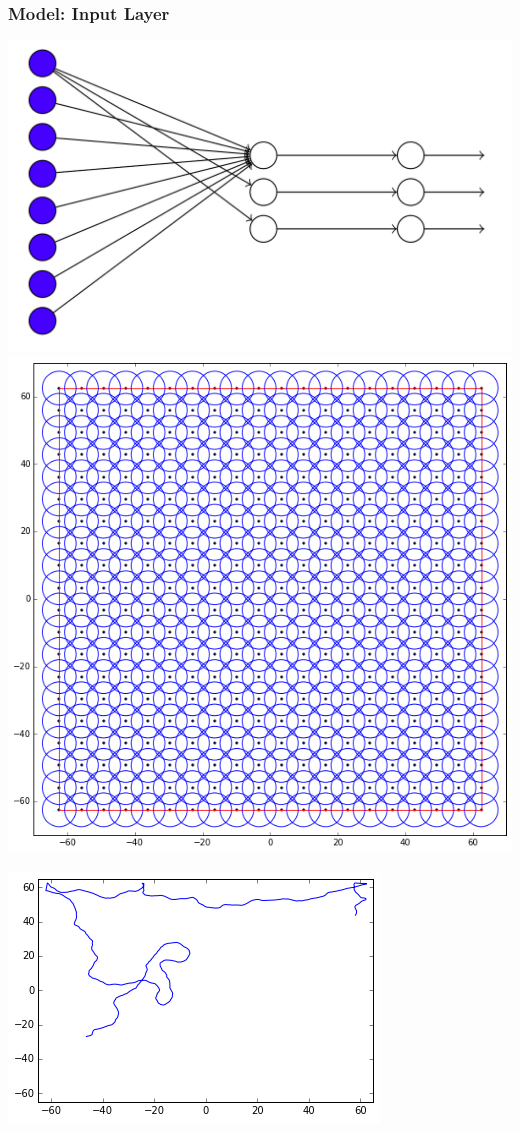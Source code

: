 \begin{frame}
\frametitle{Model: Input Layer}
\begin{multicols}{2}
\begin{center}
\includegraphics[scale=.1]{pics/model_input}
\vskip 2mm
\includegraphics[scale=.15]{pics/place_cell_locations}
\end{center}
\columnbreak
\begin{center}
\includegraphics[scale=.3]{pics/mouse_demo}

\end{center}
\end{multicols}
\end{frame}
